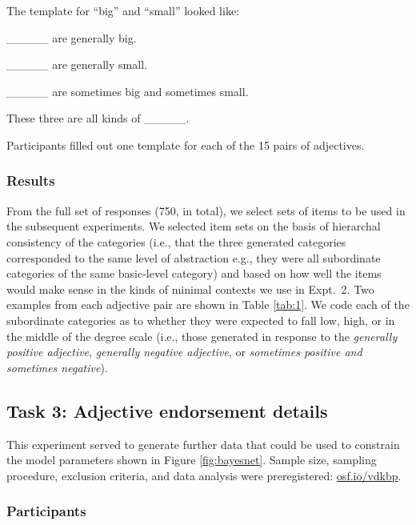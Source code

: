 \documentclass[doc]{apa6}
\begin{document}
The template for ``big'' and ``small'' looked like: 
\begin{description}[noitemsep]
\item \_\_\_\_\_ are generally big.
\item  \_\_\_\_\_ are generally small.
\item \_\_\_\_\_ are sometimes big and sometimes small.
\item These three are all kinds of \_\_\_\_\_.
\end{description}
%
Participants filled out one template for each of the 15 pairs of adjectives. 


\subsubsection{Results}
From the full set of responses (750, in total), we select sets of items to be used in the subsequent experiments. 
We selected item sets on the basis of hierarchal consistency of the categories (i.e., that the three generated categories corresponded to the same level of abstraction e.g., they were all subordinate categories of the same basic-level category) and based on how well the items would make sense in the kinds of minimal contexts we use in Expt.~2. 
Two examples from each adjective pair are shown in Table \ref{tab:1}. 
We code each of the subordinate categories as to whether they were expected to fall low, high, or in the middle of the degree scale (i.e., those generated in response to the \emph{generally positive adjective}, \emph{generally negative adjective}, or \emph{sometimes positive and sometimes negative}). 


\subsection{Task 3: Adjective endorsement details} 

This experiment served to generate further data that could be used to constrain the model parameters shown in Figure \ref{fig:bayesnet}.
Sample size, sampling procedure, exclusion criteria, and data analysis were preregistered: \url{osf.io/vdkbp}.

\subsubsection{Participants}
\end{document}
